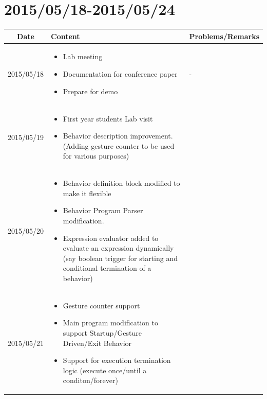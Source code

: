 \documentclass[11pt]{article} %
\begin{document}
\newpage
\section{2015/05/18-2015/05/24}

\begin{center}
    \begin{longtable}{ | c | p{6cm} | p{5cm} |}
    \hline
    Date & Content & Problems/Remarks \\ 
    \endhead
    \hline    
     2015/05/18         & 
  \begin{itemize}
  \item Lab meeting
  \item Documentation for conference paper
  \item Prepare for demo
\end{itemize}  
   & - \\
\hline
  										 
 2015/05/19         & 
  \begin{itemize}
  \item First year students Lab visit
  \item Behavior description improvement. (Adding gesture counter to be used for various purposes)
\end{itemize}   
& 
 \\
\hline
  										 
  
  2015/05/20        & 
  \begin{itemize}
  \item Behavior definition block modified to make it flexible
  \item Behavior Program Parser modification.
  \item Expression evaluator added to evaluate an expression dynamically (say boolean trigger for starting and conditional termination of a behavior)
  \end{itemize}   
  										 & 
 
  										 \\
  \hline
  
  2015/05/21         & 
  \begin{itemize}
  \item Gesture counter support
  \item Main program modification to support Startup/Gesture Driven/Exit Behavior
  \item Support for execution termination logic (execute once/until a conditon/forever)
  \end{itemize}
  & 
\\  										 \hline


\end{longtable}
\end{center}
\end{document}

